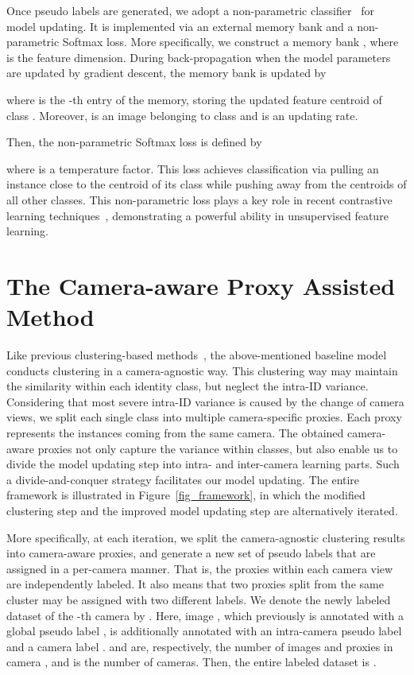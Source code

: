 \documentclass[letterpaper]{article} \usepackage{aaai21}  \usepackage{times}  \usepackage{helvet} \usepackage{courier}  \usepackage[hyphens]{url}  \usepackage{graphicx} \usepackage{subcaption}
\begin{document}
Once pseudo labels are generated, we adopt a non-parametric classifier~\cite{wu2018memory} for model updating. It is implemented via an external memory bank and a non-parametric Softmax loss. More specifically, we construct a memory bank , where  is the feature dimension. During back-propagation when the model parameters are updated by gradient descent, the memory bank is updated by

where  is the -th entry of the memory, storing the updated feature centroid of class . Moreover,  is an image belonging to class  and  is an updating rate. 

Then, the non-parametric Softmax loss is defined by 

where  is a temperature factor. This loss achieves classification via pulling an instance close to the centroid of its class while pushing away from the centroids of all other classes. This non-parametric loss plays a key role in recent contrastive learning techniques~\cite{wu2018memory,zhong2019invariance,Chen2020SimCLR,he2019momentum}, demonstrating a powerful ability in unsupervised feature learning.


\section{The Camera-aware Proxy Assisted Method}
Like previous clustering-based methods~\cite{unsup_clustering,lin2019aBottom,zeng2020hierarchical,zhai2020ad}, the above-mentioned baseline model conducts clustering in a camera-agnostic way. This clustering way may maintain the similarity within each identity class, but neglect the intra-ID variance. Considering that most severe intra-ID variance is caused by the change of camera views, we split each single class into multiple camera-specific proxies. Each proxy represents the instances coming from the same camera. The obtained camera-aware proxies not only capture the variance within classes, but also enable us to divide the model updating step into intra- and inter-camera learning parts. Such a divide-and-conquer strategy facilitates our model updating. The entire framework is illustrated in Figure~\ref{fig_framework}, in which the modified clustering step and the improved model updating step are alternatively iterated. 



More specifically, at each iteration, we split the camera-agnostic clustering results into camera-aware proxies, and generate a new set of pseudo labels that are assigned in a per-camera manner. That is, the proxies within each camera view are independently labeled. It also means that two proxies split from the same cluster may be assigned with two different labels. We denote the newly labeled dataset of the -th camera by . Here, image , which previously is annotated with a global pseudo label , is additionally annotated with an intra-camera pseudo label  and a camera label .  and  are, respectively, the number of images and proxies in camera , and  is the number of cameras. Then, the entire labeled dataset is .
\end{document}
